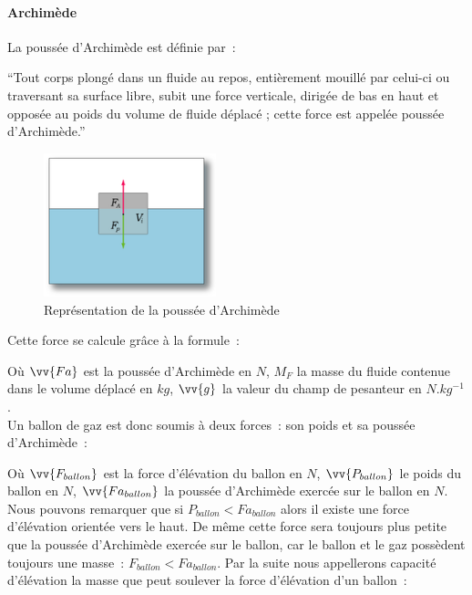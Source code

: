 \documentclass[a4paper,11pt]{article}
\begin{document}
\paragraph{Archimède}

La poussée d'Archimède est définie par~:

\enquote{Tout corps plongé dans un fluide au repos, entièrement mouillé par celui-ci ou traversant sa surface libre, subit une force verticale, dirigée de bas en haut et opposée au poids du volume de fluide déplacé ; cette force est appelée poussée d'Archimède.}

\begin{figure}[H]
	\centering
	\includegraphics[width=5cm]{../Images/pousse_archimede.png}
	\caption{Représentation de la poussée d'Archimède}
\end{figure}

Cette force se calcule grâce à la formule~:

\begin{center}
\end{center}

Où $\vv{Fa}$ est la poussée d'Archimède en $N$, $M_F$ la masse du fluide contenue dans le volume déplacé en $kg$, $\vv{g}$ la valeur du champ de pesanteur en $N.kg^{-1}$. \\

Un ballon de gaz est donc soumis à deux forces~: son poids et sa poussée d'Archimède~:

\begin{center}
\end{center}

Où $\vv{F_{ballon}}$ est la force d'élévation du ballon en $N$, $\vv{P_{ballon}}$ le poids du ballon en $N$, $\vv{Fa_{ballon}}$ la poussée d'Archimède exercée sur le ballon en $N$. \\

Nous pouvons remarquer que si $P_{ballon} < Fa_{ballon}$ alors il existe une force d'élévation orientée vers le haut. De même cette force sera toujours plus petite que la poussée d'Archimède exercée sur le ballon, car le ballon et le gaz possèdent toujours une masse~: $F_{ballon} < Fa_{ballon}$.
Par la suite nous appellerons capacité d'élévation la masse que peut soulever la force d'élévation d'un ballon~:
\begin{center}
\end{center}
\end{document}
